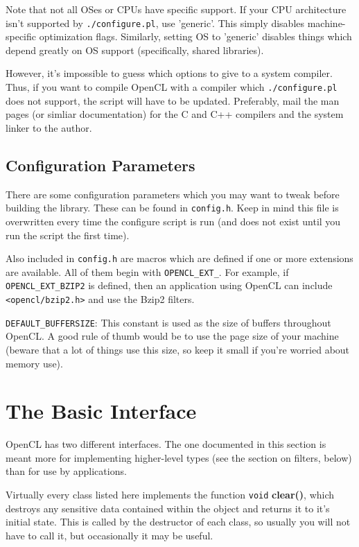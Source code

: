 \documentclass{article}
\newcommand{\filename}[1]{\texttt{#1}}
\newcommand{\function}[1]{\textbf{#1}}
\newcommand{\type}[1]{\texttt{#1}}
\begin{document}
Note that not all OSes or CPUs have specific support. If your CPU architecture
isn't supported by \filename{./configure.pl}, use 'generic'. This simply
disables machine-specific optimization flags. Similarly, setting OS to
'generic' disables things which depend greatly on OS support (specifically,
shared libraries).

However, it's impossible to guess which options to give to a system compiler.
Thus, if you want to compile OpenCL with a compiler which
\filename{./configure.pl} does not support, the script will have to be updated.
Preferably, mail the man pages (or simliar documentation) for the C and C++
compilers and the system linker to the author.

\pagebreak

\subsection{Configuration Parameters}

There are some configuration parameters which you may want to tweak before
building the library. These can be found in \filename{config.h}. Keep in mind
this file is overwritten every time the configure script is run (and does not
exist until you run the script the first time).

Also included in \filename{config.h} are macros which are defined if one or
more extensions are available. All of them begin with \verb|OPENCL_EXT_|. For
example, if \verb|OPENCL_EXT_BZIP2| is defined, then an application using
OpenCL can include \filename{<opencl/bzip2.h>} and use the Bzip2 filters.

\texttt{DEFAULT\_BUFFERSIZE}: This constant is used as the size of buffers
throughout OpenCL. A good rule of thumb would be to use the page size of your
machine (beware that a lot of things use this size, so keep it small if you're
worried about memory use).

\pagebreak

\section{The Basic Interface}

OpenCL has two different interfaces. The one documented in this section is
meant more for implementing higher-level types (see the section on filters,
below) than for use by applications.

Virtually every class listed here implements the function \type{void}
\function{clear()}, which destroys any sensitive data contained within the
object and returns it to it's initial state. This is called by the destructor
of each class, so usually you will not have to call it, but occasionally it may
be useful.
\end{document}
